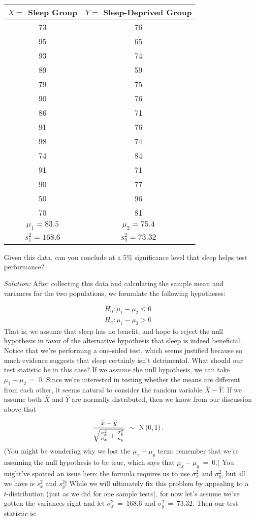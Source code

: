 \begin{center}
\begin{tabular}{|c|c|}
\hline
$X=$ Sleep Group & $Y=$ Sleep-Deprived Group\tabularnewline
\hline
\hline
73 & 76\tabularnewline
\hline
95 & 65\tabularnewline
\hline
93 & 74\tabularnewline
\hline
89 & 59\tabularnewline
\hline
79 & 75\tabularnewline
\hline
90 & 76\tabularnewline
\hline
86 & 71\tabularnewline
\hline
91 & 76\tabularnewline
\hline
98 & 74\tabularnewline
\hline
74 & 84\tabularnewline
\hline
91 & 71\tabularnewline
\hline
90 & 77\tabularnewline
\hline
50 & 96\tabularnewline
\hline
70 & 81\tabularnewline
\hline
$\mu_{1}=83.5$ & $\mu_{2}=75.4$\tabularnewline
\hline
$s_{1}^{2}=168.6$ & $s_{2}^{2}=73.32$\tabularnewline
\hline
\end{tabular}
\par\end{center}

Given this data, can you conclude at a 5\% significance level that sleep helps test performance?

\emph{Solution:}  After collecting this data and calculating the sample mean and variances for the two populations, we formulate the following hypotheses:

\begin{eqnarray}
H_0:\mu_{1}-\mu_{2}\leq 0 \nonumber\\
H_a:\mu_{1}-\mu_{2}>0
\end{eqnarray}
That is, we assume that sleep has no benefit, and hope to reject the null hypothesis in favor of the alternative hypothesis
that sleep is indeed beneficial. Notice that we're performing a one-sided test, which seems justified because so much evidence suggests that sleep certainly isn't detrimental.  What should our test statistic be in this case?  If we assume the null hypothesis, we can take $\mu_1 - \mu_2\ = \ 0$.  Since we're interested in testing whether the means are different from each other, it seems natural to consider the random variable $\bar{X} - \bar{Y}$.  If we assume both $\bar{X}$ and $\bar{Y}$ are normally distributed, then we know from our discussion above that

\begin{equation*}
\frac{\bar{x} - \bar{y}}{\sqrt{\frac{\sigma^2_x}{n_x}+\frac{\sigma^2_y}{n_y}}} \ \sim \  {\rm N}\left(0,1\right).
\end{equation*}
(You might be wondering why we lost the $\mu_x - \mu_y$ term: remember that we're assuming the null hypothesis to be true, which says that $\mu_x - \mu_y \ = \ 0$.)  You might've spotted an issue here: the formula requires us to use $\sigma^2_x$ and $\sigma^2_y$, but all we have is $s^2_x$ and $s^2_y$!  While we will ultimately fix this problem by appealing to a $t$-distribution (just as we did for one sample tests), for now let's assume we've gotten the variances right and let $\sigma^2_x\ = \ 168.6$ and $\sigma^2_y\ = \ 73.32$.  Then our test statistic is:

